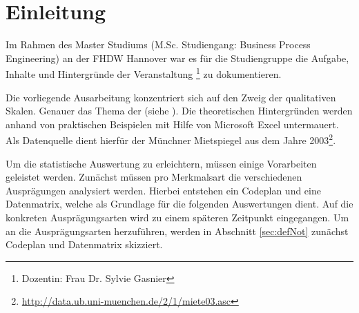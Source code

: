 \section{Einleitung}

Im Rahmen des Master Studiums (M.Sc. Studiengang: Business Process Engineering) an der FHDW Hannover
war es für die Studiengruppe  die Aufgabe, Inhalte und Hintergründe der Veranstaltung \footnote{Dozentin: Frau Dr. Sylvie Gasnier} zu dokumentieren.


Die vorliegende Ausarbeitung konzentriert sich auf den Zweig der qualitativen Skalen. Genauer das Thema der  (siehe ). 
Die theoretischen Hintergründen werden anhand von praktischen Beispielen mit Hilfe von Microsoft Excel untermauert. 
Als Datenquelle dient hierfür der Münchner Mietspiegel aus dem Jahre 2003\footnote{\url{http://data.ub.uni-muenchen.de/2/1/miete03.asc}}.

Um die statistische Auswertung zu erleichtern, müssen einige Vorarbeiten geleistet werden. Zunächst müssen pro Merkmalsart die verschiedenen Ausprägungen 
analysiert werden. Hierbei entstehen ein Codeplan und eine Datenmatrix, welche als Grundlage für die folgenden Auswertungen dient. 
Auf die konkreten Ausprägungsarten wird zu einem späteren Zeitpunkt eingegangen. Um an die
Ausprägungsarten herzuführen, werden in Abschnitt \ref{sec:defNot} zunächst Codeplan und Datenmatrix
skizziert.
